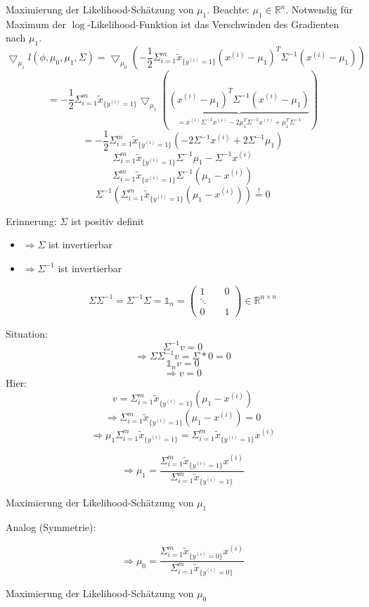 Maximierung der Likelihood-Schätzung von $\mu_1$. Beachte: $\mu_1 \in \mathbb{R}^n$. Notwendig für Maximum der $\log$-Likelihood-Funktion ist das Verschwinden des Gradienten nach $\mu_1$.
\[\bigtriangledown_{\mu_1} l(\phi, \mu_0, \mu_1, \Sigma) = \bigtriangledown_{\mu_0} (- \frac{1}{2} \Sigma^m_{i=1} \tilde{x}_{\{y^{(i)} = 1\}} (x^{(i)}-\mu_1)^T \Sigma^{-1} (x^{(i)} - \mu_1))\]
\[= - \frac{1}{2} \Sigma^m_{i=1} \tilde{x}_{\{y^{(i)} = 1\}} \bigtriangledown_{\mu_1}(\underbrace{(x^{(i)} - \mu_1)^T \Sigma^{-1} (x^{(i)} - \mu_1)}_{\substack{= x^{(i)} \Sigma^{-1} x^{(i)} -2\mu_1^T \Sigma^{-1} x^{(i)} + \mu_1^T \Sigma^{-1}}})\]
\[= - \frac{1}{2} \Sigma^m_{i=1} \tilde{x}_{\{y^{(i)} = 1\}} (-2 \Sigma^{-1} x^{(i)} + 2 \Sigma^{-1} \mu_1)\]
\[\Sigma^m_{i=1} \tilde{x}_{\{y^{(i)} = 1\}} \Sigma^{-1} \mu_1 - \Sigma^{-1} x^{(i)}\]
\[\Sigma^m_{i=1} \tilde{x}_{\{x^{(i)} = 1\}} \Sigma^{-1} (\mu_1 - x^{(i)})\]
\[\Sigma^{-1} (\Sigma^m_{i=1} \tilde{x}_{\{y^{(i)} = 1\}} (\mu_1 - x^{(i)})) \stackrel{!}{=} 0\]

\begin{framed}
Erinnerung: $\Sigma$ ist positiv definit
\begin{itemize}
\item $\Rightarrow \Sigma$ ist invertierbar
\item $\Rightarrow \Sigma^{-1}$ ist invertierbar 
\end{itemize}
\[\Sigma\Sigma^{-1} = \Sigma^{-1}\Sigma = \mathds{1}_n = \left( \begin{array}{ccc} 1 \quad\quad 0 \\ \ddots \\ 0 \quad\quad 1 \end{array}\right) \in \mathbb{R}^{n \times n}\]
\end{framed}
Situation:
\[\Sigma^{-1} v = 0\]
\[\Rightarrow \Sigma\Sigma^{-1} v = \Sigma * 0 = 0\]
\[\mathds{1}_n v = 0\]
\[\Rightarrow v = 0\]
Hier:
\[v = \Sigma^m_{i=1} \tilde{x}_{\{y^{(i)}= 1\}} (\mu_1 - x^{(i)})\]
\[\Rightarrow \Sigma^m_{i=1} \tilde{x}_{\{y^{(i)}=1\}} (\mu_1 - x^{(i)}) = 0\]
\[\Rightarrow \mu_1 \Sigma^m_{i=1} \tilde{x}_{\{ y^{(i)} = 1\}} = \Sigma^m_{i=1} \tilde{x}_{\{y^{(i)}=1\}} x^{(i)}\]
\begin{framed}
\[\Rightarrow \mu_1 = \frac{\Sigma^m_{i=1}\tilde{x}_{\{y^{(i)}=1\}} x^{(i)}}{\Sigma^m_{i=1}\tilde{x}_{\{y^{(i)}=1\}}}\]
\begin{center}
Maximierung der Likelihood-Schätzung von $\mu_1$
\end{center}
\end{framed}
Analog (Symmetrie):
\begin{framed}
\[\Rightarrow \mu_0 = \frac{\Sigma^m_{i=1}\tilde{x}_{\{y^{(i)}=0\}} x^{(i)}}{\Sigma^m_{i=1}\tilde{x}_{\{y^{(i)}=0\}}}\]
\begin{center}
Maximierung der Likelihood-Schätzung von $\mu_0$
\end{center}
\end{framed}



